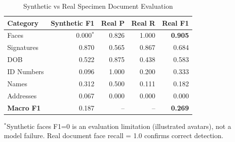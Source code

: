 \begin{table}[h]\centering
\caption{Synthetic vs Real Specimen Document Evaluation}
\label{tab:real_eval}
\begin{tabular}{lrrrr}
\toprule
Category & Synthetic F1 & Real P & Real R & Real F1 \\
\midrule
Faces      & 0.000$^*$ & 0.826 & 1.000 & \textbf{0.905} \\
Signatures & 0.870      & 0.565 & 0.867 & 0.684 \\
DOB        & 0.522      & 0.875 & 0.438 & 0.583 \\
ID Numbers & 0.096      & 1.000 & 0.200 & 0.333 \\
Names      & 0.312      & 0.500 & 0.111 & 0.182 \\
Addresses  & 0.067      & 0.000 & 0.000 & 0.000 \\
\midrule
\textbf{Macro F1} & 0.187 & -- & -- & \textbf{0.269} \\
\bottomrule
\end{tabular}
\vspace{2pt}
\footnotesize{$^*$Synthetic faces F1=0 is an evaluation
limitation (illustrated avatars), not a model failure.
Real document face recall = 1.0 confirms correct detection.}
\end{table}
